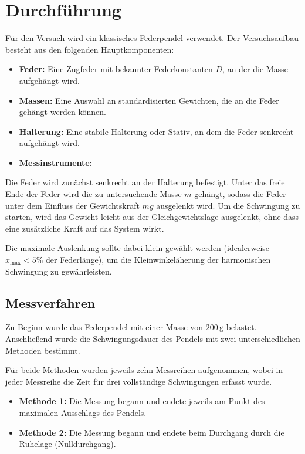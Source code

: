 \chapter{Durchführung}

Für den Versuch wird ein klassisches Federpendel verwendet. Der Versuchsaufbau besteht aus den folgenden Hauptkomponenten:

\begin{itemize}
    \item \textbf{Feder:} Eine Zugfeder mit bekannter Federkonstanten $D$, an der die Masse aufgehängt wird.
    \item \textbf{Massen:} Eine Auswahl an standardisierten Gewichten, die an die Feder gehängt werden können.
    \item \textbf{Halterung:} Eine stabile Halterung oder Stativ, an dem die Feder senkrecht aufgehängt wird.
    \item \textbf{Messinstrumente:} 
\end{itemize}

Die Feder wird zunächst senkrecht an der Halterung befestigt. Unter das freie Ende der Feder wird die zu untersuchende Masse $m$ gehängt, sodass die Feder unter dem Einfluss der Gewichtskraft $mg$ ausgelenkt wird. Um die Schwingung zu starten, wird das Gewicht leicht aus der Gleichgewichtslage ausgelenkt, ohne dass eine zusätzliche Kraft auf das System wirkt.  

Die maximale Auslenkung sollte dabei klein gewählt werden (idealerweise $x_\text{max} < 5\%$ der Federlänge), um die Kleinwinkeläherung der harmonischen Schwingung zu gewährleisten.  

\section{Messverfahren}

Zu Beginn wurde das Federpendel mit einer Masse von $200\,\mathrm{g}$ belastet. Anschließend wurde die Schwingungsdauer des Pendels mit zwei unterschiedlichen Methoden bestimmt.  

Für beide Methoden wurden jeweils zehn Messreihen aufgenommen, wobei in jeder Messreihe die Zeit für drei vollständige Schwingungen erfasst wurde.  

\begin{itemize}
    \item \textbf{Methode 1:} Die Messung begann und endete jeweils am Punkt des maximalen Ausschlags des Pendels.  
    \item \textbf{Methode 2:} Die Messung begann und endete beim Durchgang durch die Ruhelage (Nulldurchgang).  
\end{itemize}

